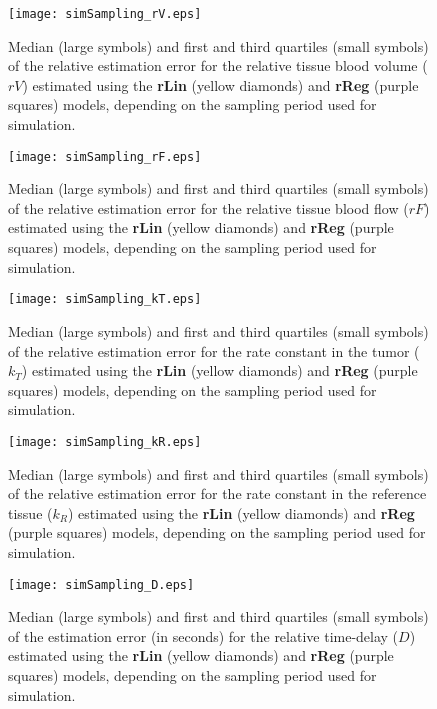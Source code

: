 \begin{subfigures}
    \begin{figure}
        \texttt{[image: simSampling\_rV.eps]}
        \caption{Median (large symbols) and first and third quartiles (small symbols) of the relative estimation error for the relative tissue blood volume ($rV$) estimated using the \textbf{rLin} (yellow diamonds) and \textbf{rReg} (purple squares) models, depending on the sampling period used for simulation.}
        \label{fig:sampling_rV}
    \end{figure}
    \begin{figure}
        \texttt{[image: simSampling\_rF.eps]}
        \caption{Median (large symbols) and first and third quartiles (small symbols) of the relative estimation error for the relative tissue blood flow ($rF$) estimated using the \textbf{rLin} (yellow diamonds) and \textbf{rReg} (purple squares) models, depending on the sampling period used for simulation.}
        \label{fig:sampling_rF}
    \end{figure}
    \begin{figure}
        \texttt{[image: simSampling\_kT.eps]}
        \caption{Median (large symbols) and first and third quartiles (small symbols) of the relative estimation error for the rate constant in the tumor ($k_T$) estimated using the \textbf{rLin} (yellow diamonds) and \textbf{rReg} (purple squares) models, depending on the sampling period used for simulation.}
        \label{fig:sampling_kT}
    \end{figure}
    \begin{figure}
        \texttt{[image: simSampling\_kR.eps]}
        \caption{Median (large symbols) and first and third quartiles (small symbols) of the relative estimation error for the rate constant in the reference tissue ($k_R$) estimated using the \textbf{rLin} (yellow diamonds) and \textbf{rReg} (purple squares) models, depending on the sampling period used for simulation.}
        \label{fig:sampling_kR}
    \end{figure}
    \begin{figure}
        \texttt{[image: simSampling\_D.eps]}
        \caption{Median (large symbols) and first and third quartiles (small symbols) of the estimation error (in seconds) for the relative time-delay ($D$) estimated using the \textbf{rLin} (yellow diamonds) and \textbf{rReg} (purple squares) models, depending on the sampling period used for simulation.}
        \label{fig:sampling_D}
    \end{figure}
\end{subfigures}
\FloatBarrier

